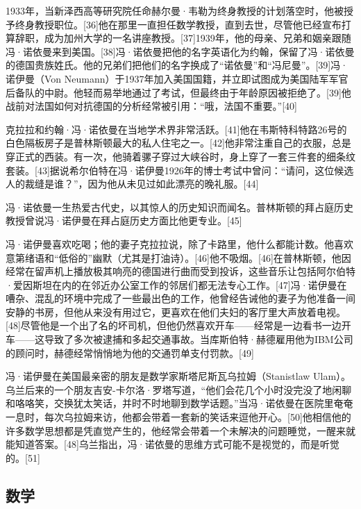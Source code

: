 1933年，当新泽西高等研究院任命赫尔曼·韦勒为终身教授的计划落空时，他被授予终身教授职位。[36]他在那里一直担任数学教授，直到去世，尽管他已经宣布打算辞职，成为加州大学的一名讲座教授。[37]1939年，他的母亲、兄弟和姻亲跟随冯·诺依曼来到美国。[38]冯·诺依曼把他的名字英语化为约翰，保留了冯·诺依曼的德国贵族姓氏。他的兄弟们把他们的名字换成了“诺依曼”和“冯尼曼”。[39]冯·诺伊曼（Von Neumann）于1937年加入美国国籍，并立即试图成为美国陆军军官后备队的中尉。他轻而易举地通过了考试，但最终由于年龄原因被拒绝了。[39]他战前对法国如何对抗德国的分析经常被引用：“哦，法国不重要。”[40]

克拉拉和约翰·冯·诺依曼在当地学术界非常活跃。[41]他在韦斯特科特路26号的白色隔板房子是普林斯顿最大的私人住宅之一。[42]他非常注重自己的衣服，总是穿正式的西装。有一次，他骑着骡子穿过大峡谷时，身上穿了一套三件套的细条纹套装。[43]据说希尔伯特在冯·诺伊曼1926年的博士考试中曾问：“请问，这位候选人的裁缝是谁？”，因为他从未见过如此漂亮的晚礼服。[44]

冯·诺依曼一生热爱古代史，以其惊人的历史知识而闻名。普林斯顿的拜占庭历史教授曾说冯·诺伊曼在拜占庭历史方面比他更专业。[45]

冯·诺伊曼喜欢吃喝；他的妻子克拉拉说，除了卡路里，他什么都能计数。他喜欢意第绪语和“低俗的”幽默（尤其是打油诗）。[46]他不吸烟。[46]在普林斯顿，他因经常在留声机上播放极其响亮的德国进行曲而受到投诉，这些音乐让包括阿尔伯特·爱因斯坦在内的在邻近办公室工作的邻居们都无法专心工作。[47]冯·诺伊曼在嘈杂、混乱的环境中完成了一些最出色的工作，他曾经告诫他的妻子为他准备一间安静的书房，但他从来没有用过它，更喜欢在他们夫妇的客厅里大声放着电视。[48]尽管他是一个出了名的坏司机，但他仍然喜欢开车——经常是一边看书一边开车——这导致了多次被逮捕和多起交通事故。当库斯伯特·赫德雇用他为IBM公司的顾问时，赫德经常悄悄地为他的交通罚单支付罚款。[49]

冯·诺伊曼在美国最亲密的朋友是数学家斯塔尼斯瓦乌拉姆（Stanistlaw Ulam）。乌兰后来的一个朋友吉安-卡尔洛·罗塔写道，“他们会花几个小时没完没了地闲聊和咯咯笑，交换犹太笑话，并时不时地聊到数学话题。”当冯·诺依曼在医院里奄奄一息时，每次乌拉姆来访，他都会带着一套新的笑话来逗他开心。[50]他相信他的许多数学思想都是凭直觉产生的，他经常会带着一个未解决的问题睡觉，一醒来就能知道答案。[48]乌兰指出，冯·诺依曼的思维方式可能不是视觉的，而是听觉的。[51]

\subsection{数学}

